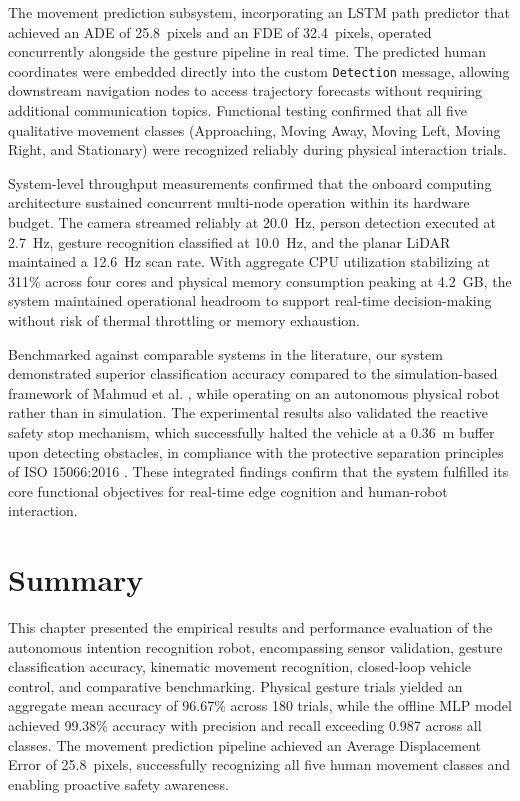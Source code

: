 The movement prediction subsystem, incorporating an LSTM path predictor that achieved an ADE of 25.8~pixels and an FDE of 32.4~pixels, operated concurrently alongside the gesture pipeline in real time. The predicted human coordinates were embedded directly into the custom \texttt{Detection} message, allowing downstream navigation nodes to access trajectory forecasts without requiring additional communication topics. Functional testing confirmed that all five qualitative movement classes (Approaching, Moving Away, Moving Left, Moving Right, and Stationary) were recognized reliably during physical interaction trials.

System-level throughput measurements confirmed that the onboard computing architecture sustained concurrent multi-node operation within its hardware budget. The camera streamed reliably at 20.0~Hz, person detection executed at 2.7~Hz, gesture recognition classified at 10.0~Hz, and the planar LiDAR maintained a 12.6~Hz scan rate. With aggregate CPU utilization stabilizing at 311\% across four cores and physical memory consumption peaking at 4.2~GB, the system maintained operational headroom to support real-time decision-making without risk of thermal throttling or memory exhaustion.

Benchmarked against comparable systems in the literature, our system demonstrated superior classification accuracy compared to the simulation-based framework of Mahmud et al. \cite{mahmud2022}, while operating on an autonomous physical robot rather than in simulation. The experimental results also validated the reactive safety stop mechanism, which successfully halted the vehicle at a 0.36~m buffer upon detecting obstacles, in compliance with the protective separation principles of ISO 15066:2016 \cite{iso150662016}. These integrated findings confirm that the system fulfilled its core functional objectives for real-time edge cognition and human-robot interaction.

\section{Summary}
This chapter presented the empirical results and performance evaluation of the autonomous intention recognition robot, encompassing sensor validation, gesture classification accuracy, kinematic movement recognition, closed-loop vehicle control, and comparative benchmarking. Physical gesture trials yielded an aggregate mean accuracy of 96.67\% across 180 trials, while the offline MLP model achieved 99.38\% accuracy with precision and recall exceeding 0.987 across all classes. The movement prediction pipeline achieved an Average Displacement Error of 25.8~pixels, successfully recognizing all five human movement classes and enabling proactive safety awareness.

